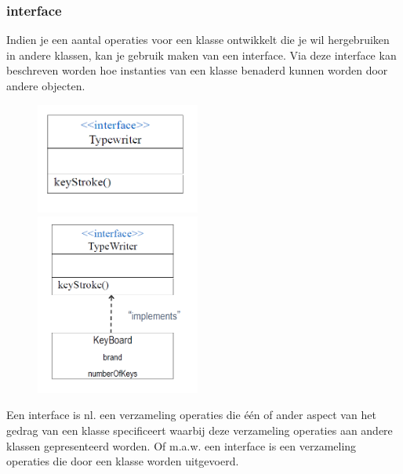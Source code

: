 \subsubsection{interface}

Indien je een aantal operaties voor een klasse ontwikkelt die je wil hergebruiken in andere klassen, kan je gebruik maken van een interface. Via deze interface kan beschreven worden hoe instanties van een klasse benaderd kunnen worden door andere objecten.

\begin{figure}
  \begin{center}
    \includegraphics[width=0.48\textwidth]{img/int1}
  \end{center}
  \begin{center}
    \includegraphics[width=0.48\textwidth]{img/int2}
  \end{center}
\end{figure}
Een interface is nl. een verzameling operaties die één of ander aspect van het gedrag van een klasse specificeert waarbij deze verzameling operaties aan andere klassen gepresenteerd worden.
Of m.a.w. een interface is een verzameling operaties die door een klasse worden uitgevoerd.

